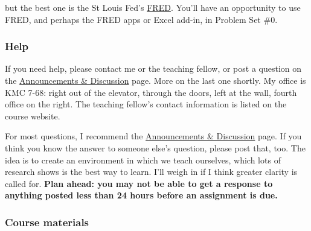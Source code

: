 \documentclass[12pt]{article}
\begin{document}
but the best one is the St Louis Fed's
\href{http://research.stlouisfed.org/fred2/}{FRED}.
You'll have an opportunity to use FRED, and perhaps the FRED apps or Excel add-in,
in Problem Set \#0.



\subsubsection*{Help}

If you need help, please contact me or the teaching fellow, or post a question
on the
\href{https://sites.google.com/site/nyusternglobal/home/announcements}{Announcements \& Discussion}
page.
More on the last one shortly.
My office is KMC 7-68:
right out of the elevator, through the doors, left at the wall, fourth office on the right.
The teaching fellow's contact information is listed
on the course website.

For most questions, I recommend the
\href{https://sites.google.com/site/nyusternglobal/home/announcements}{Announcements \& Discussion}
page.
If you think you know the answer to someone else's question, please post that, too.
The idea is to create an environment in which we teach ourselves,
which lots of research shows is the best way to learn.
I'll weigh in if I think greater clarity is called for.
{\bf Plan ahead:  you may not be able to get a response to anything posted
less than 24 hours before an assignment is due.}



\subsubsection*{Course materials}
\end{document}
